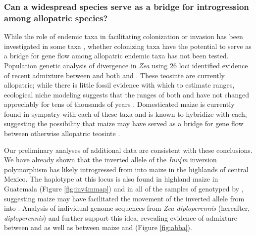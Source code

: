 \subsubsection{Can a widespread species serve as a bridge for introgression among allopatric species?}
\label{sss:bridge}

While the role of endemic taxa in facilitating colonization or invasion has been investigated in some taxa \citep{Bock2015}, whether colonizing taxa have the potential to serve as a bridge for gene flow among allopatric endemic taxa has not been tested. 
Population genetic analysis of divergence in \emph{Zea} using 26 loci identified evidence of recent admixture between \zl{} and both \zp{} and \zm{} \citep{Ross-Ibarra2009a}. 
These teosinte are currently allopatric; while there is little fossil evidence with which to estimate ranges, ecological niche modeling suggests that the ranges of both \zp{} and \zm{} have not changed appreciably for tens of thousands of years \citep{hufford2012inferences}.  
Domesticated maize is currently found in sympatry with each of these taxa and is known to hybridize with each, suggesting the possibility that maize may have served as a bridge for gene flow between otherwise allopatric teosinte \citep{Ross-Ibarra2009a}.

Our preliminary analyses of additional data are consistent with these conclusions.
We have already shown that the inverted allele of the \emph{Inv4m} inversion polymorphism has likely introgressed from \zm{} into maize in the highlands of central Mexico.  
The \zm{} haplotype at this locus is also found in highland maize in Guatemala (Figure \ref{fig:inv4mmap}) and in all of the samples of \zm{} genotyped by \citet{Fang2012}, suggesting maize may have facilitated the movement of the inverted allele from \zm{} into \zl{}.
Analysis of individual genome sequences from \emph{Zea diploperennis} (hereafter, \emph{diploperennis}) and \zl{} \citep{tenaillon2011genome} further support this idea, revealing evidence of admixture between \zp{} and \zl{} as well as between maize and \zd{} (Figure \ref{fig:abba}).

